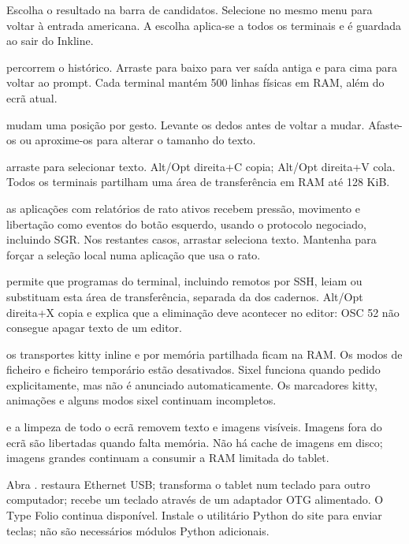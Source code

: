 Escolha o resultado na barra de candidatos. Selecione
 no mesmo menu para voltar à entrada americana.
A escolha aplica-se a todos os terminais e é guardada ao sair do Inkline.

 percorrem o histórico. Arraste para baixo para
ver saída antiga e para cima para voltar ao prompt. Cada terminal mantém
500 linhas físicas em RAM, além do ecrã atual.

 mudam uma posição por gesto.
Levante os dedos antes de voltar a mudar. Afaste-os ou aproxime-os para
alterar o tamanho do texto.

 arraste para selecionar texto. Alt/Opt direita+C copia;
Alt/Opt direita+V cola. Todos os terminais partilham uma área de transferência
em RAM até 128 KiB.

 as aplicações com relatórios de rato ativos recebem pressão,
movimento e libertação como eventos do botão esquerdo, usando o protocolo
negociado, incluindo SGR. Nos restantes casos, arrastar seleciona texto.
Mantenha  para forçar a seleção local numa aplicação que usa o rato.

 permite que programas do terminal, incluindo remotos por SSH,
leiam ou substituam esta área de transferência, separada da dos cadernos.
Alt/Opt direita+X copia e explica que a eliminação deve acontecer no editor:
OSC 52 não consegue apagar texto de um editor.

 os transportes kitty inline e por memória partilhada ficam
na RAM. Os modos de ficheiro e ficheiro temporário estão desativados.
Sixel funciona quando pedido explicitamente, mas não é anunciado automaticamente.
Os marcadores kitty, animações e alguns modos sixel continuam incompletos.

 e a limpeza de todo o ecrã removem texto e imagens visíveis.
Imagens fora do ecrã são libertadas quando falta memória. Não há cache de imagens
em disco; imagens grandes continuam a consumir a RAM limitada do tablet.

Abra .  restaura Ethernet USB;
 transforma o tablet num teclado para outro computador;
 recebe um teclado através de um adaptador OTG alimentado.
O Type Folio continua disponível. Instale o utilitário Python do site para
enviar teclas; não são necessários módulos Python adicionais.

